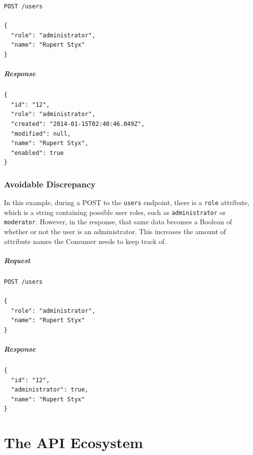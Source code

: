\documentclass{book}
\begin{document}
\begin{verbatim}
POST /users

{
  "role": "administrator",
  "name": "Rupert Styx"
}
\end{verbatim}

\paragraph{\textbf{Response}}

\begin{verbatim}
{
  "id": "12",
  "role": "administrator",
  "created": "2014-01-15T02:40:46.049Z",
  "modified": null,
  "name": "Rupert Styx",
  "enabled": true
}
\end{verbatim}

\subsection{Avoidable Discrepancy}

In this example, during a POST to the \texttt{users} endpoint, there is a \texttt{role} attribute, which is a string containing possible user roles, such as \texttt{administrator} or \texttt{moderator}. However, in the response, that same data becomes a Boolean of whether or not the user is an administrator. This increases the amount of attribute names the Consumer needs to keep track of.

\paragraph{\textbf{Request}}

\begin{verbatim}
POST /users

{
  "role": "administrator",
  "name": "Rupert Styx"
}
\end{verbatim}

\paragraph{\textbf{Response}}

\begin{verbatim}
{
  "id": "12",
  "administrator": true,
  "name": "Rupert Styx"
}
\end{verbatim}


\chapter{The API Ecosystem}
\end{document}
